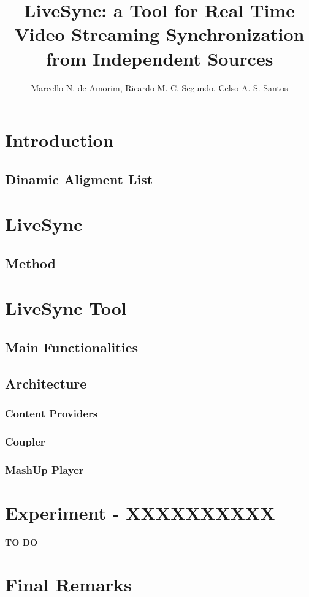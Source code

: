 \documentclass[jidm,a4paper]{jidm} %
\title{LiveSync: a Tool for Real Time Video Streaming Synchronization from Independent Sources}
\author{Marcello N. de Amorim\inst{1}, Ricardo M. C. Segundo\inst{2}, Celso A. S. Santos\inst{3}}
\institute{Universidade Federal do Espirito Santo, Brazil  \\ \email{novaes@inf.ufes.br , rmcs87@gmail.com , saibel@inf.ufes.br}
}
\begin{document}
\begin{bottomstuff}
%
\end{bottomstuff}

\maketitle

\section{Introduction}


\subsection{Dinamic Aligment List}


\section{LiveSync}


\subsection{Method}


\section{LiveSync Tool}

\subsection{Main Functionalities}


\subsection{Architecture}


\subsubsection{Content Providers}


\subsubsection{Coupler}


\subsubsection{MashUp Player}


\section{Experiment - XXXXXXXXXX}
\textbf{TO DO}

\section{Final Remarks}




\end{document}
